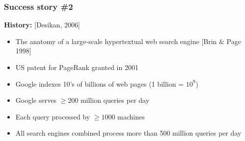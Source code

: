 \documentclass{beamer}
\begin{document}

\newcommand{\topictitle}{Google PageRank: Computation}

\newcommand{\topicsubtitle}{Power Method and Large-Scale Implementation}
\newcommand{\misoclasstinytitleslide}{Partially based on material by:  Andreas Krause, \\[-1em] Branislav Kveton, Michael Kearns}

\MakeTopicSlide

\begin{frame}

\frametitle{Success story \#2 }

\textbf{History:} {\small [Desikan, 2006]} 
\begin{itemize}
\item The anatomy of a large-scale hypertextual web
search engine [Brin \& Page 1998] \pause
\item  US patent for PageRank granted in 2001\pause
\item  Google indexes 10's of billions of web pages
(1 billion = $10^9$) \pause
\item  Google serves $\geq 200$ million queries per day \pause
\item  Each query processed by $\geq 1000$ machines \pause
\item  All search engines combined process more
than 500 million queries per day
\end{itemize}


\end{frame}
\end{document}
